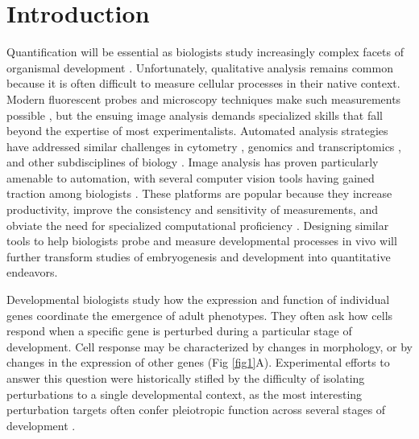\documentclass[10pt,letterpaper]{article}
\begin{document}
\linenumbers




\section*{Introduction}
Quantification will be essential as biologists study increasingly complex facets of organismal development \cite{Oates2009}. Unfortunately, qualitative analysis remains common because it is often difficult to measure cellular processes in their native context. Modern fluorescent probes and microscopy techniques make such measurements possible \cite{Muzzey2009a,Stelzer2014,Truong2011}, but the ensuing image analysis demands specialized skills that fall beyond the expertise of most experimentalists. Automated analysis strategies have addressed similar challenges in cytometry \cite{Aghaeepour2013,Chen2015,Pyne2009}, genomics and transcriptomics \cite{Bernstein2008,Hellemans2007,Langmead2012,Trapnell2009}, and other subdisciplines of biology \cite{Costes2004,Kelley2015}. Image analysis has proven particularly amenable to automation, with several computer vision tools having gained traction among biologists \cite{Carpenter2006,Paintdakhi2016,Schindelin2012,Sommer2011}. These platforms are popular because they increase productivity, improve the consistency and sensitivity of measurements, and obviate the need for specialized computational proficiency \cite{Jug2014,Sbalzarini2016,Schindelin2015}. Designing similar tools to help biologists probe and measure developmental processes in vivo will further transform studies of embryogenesis and development into quantitative endeavors.

Developmental biologists study how the expression and function of individual genes coordinate the emergence of adult phenotypes. They often ask how cells respond when a specific gene is perturbed during a particular stage of development. Cell response may be characterized by changes in morphology, or by changes in the expression of other genes (Fig \ref{fig1}A). Experimental efforts to answer this question were historically stifled by the difficulty of isolating perturbations to a single developmental context, as the most interesting perturbation targets often confer pleiotropic function across several stages of development \cite{IanSimpson2002,Parody1993,Shilo1991}. 
\end{document}
